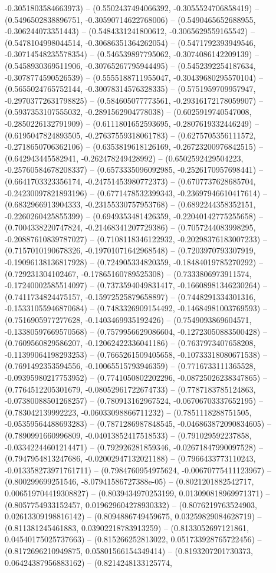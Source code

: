 -0.3051803584663973) -- (0.5502437494066392, -0.3055524706858419) -- (0.5496502838896751, -0.30590714622768006) -- (0.5490465652688955, -0.306244073351443) -- (0.5484331241800612, -0.3065629559165542) -- (0.5478104998044514, -0.30686351364262054) -- (0.5471792393949546, -0.30714548235578354) -- (0.546539897795062, -0.3074086142209139) -- (0.5458930369511906, -0.30765267795944495) -- (0.5452392254187634, -0.3078774590526539) -- (0.5555188711955047, -0.30439680295570104) -- (0.5655024765752144, -0.30078314576328335) -- (0.5751959709957947, -0.29703772631798825) -- (0.584605077773561, -0.29316172178059907) -- (0.5937353107555032, -0.2891562904778038) -- (0.6025919740547008, -0.2850226132791909) -- (0.6111801652593695, -0.2807619332446249) -- (0.6195047824893505, -0.27637559318061783) -- (0.6275705356111572, -0.2718650706362106) -- (0.6353819618126169, -0.26723200976842515) -- (0.642943445582941, -0.262478249428992) -- (0.6502592429504223, -0.25760584678208337) -- (0.6573335096092985, -0.2526170957698441) -- (0.6641703323356174, -0.24751453980772373) -- (0.6707737628685704, -0.24230097821893196) -- (0.6771478532399343, -0.23697946610417614) -- (0.6832966913904333, -0.23155330757953768) -- (0.6892244358352151, -0.2260260425855399) -- (0.6949353481426359, -0.22040142775255658) -- (0.7004338220747824, -0.21468341207729386) -- (0.7057244083998295, -0.20887610839787027) -- (0.7108118346122932, -0.20298376183007233) -- (0.7157010190678326, -0.19701071642968548) -- (0.7203970793307919, -0.19096138136817928) -- (0.724905334820359, -0.18484019785270292) -- (0.729231304102467, -0.17865160789525308) -- (0.7333806973911574, -0.17240002585514097) -- (0.7373594049831417, -0.16608981346230264) -- (0.7411734824475157, -0.15972525879658897) -- (0.7448291334301316, -0.15331055946870684) -- (0.7483326909154492, -0.14684981003769593) -- (0.7516905977277628, -0.1403469935192426) -- (0.7549093869604571, -0.13380597669570568) -- (0.7579956629086604, -0.12723050883500428) -- (0.7609560829586207, -0.12062422336041186) -- (0.7637973407658208, -0.11399064198293253) -- (0.7665261509405658, -0.10733318080671538) -- (0.7691492353594556, -0.10065515793946359) -- (0.7716733111365528, -0.09395980217753952) -- (0.7741050802202296, -0.08725026238347865) -- (0.7764512205301679, -0.08052961722674733) -- (0.7787183785124863, -0.07380088501268257) -- (0.780913162967524, -0.06706703337652195) -- (0.783042139992223, -0.06033098866711232) -- (0.7851118288751505, -0.05359564488693283) -- (0.7871286987848545, -0.046863872090834605) -- (0.7890991660996809, -0.04013852417518533) -- (0.791029592237858, -0.03342244601214471) -- (0.792926281859346, -0.02671847990097528) -- (0.7947954813247686, -0.02002947132021188) -- (0.7966433773110243, -0.013358273971761711) -- (0.7984760954975624, -0.00670775411123967) -- (0.800299699251546, -8.07941586727388e-05) -- (0.8021201882542717, 0.006519704419308827) -- (0.8039434970253199, 0.013090818969971371) -- (0.8057754933152457, 0.019629604278930332) -- (0.8076219763524903, 0.02613309198816142) -- (0.8094886749459675, 0.03259829084628719) -- (0.811381245461883, 0.03902218783913259) -- (0.8133052697121861, 0.04540175025737663) -- (0.815266252813022, 0.051733928765722456) -- (0.8172696210949875, 0.05801566154349414) -- (0.8193207201730373, 0.06424387956883162) -- (0.8214248133125774, 